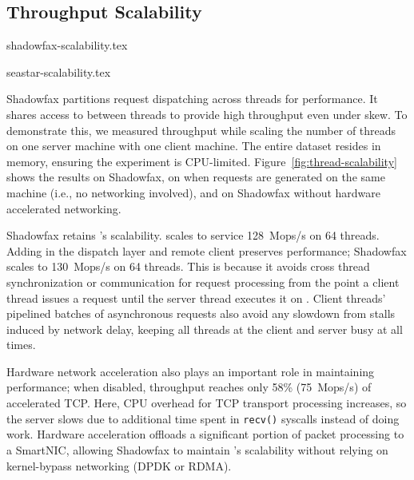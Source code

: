 \subsection{Throughput Scalability}
\label{sec:eval:clients}

 {shadowfax-scalability.tex}

 {seastar-scalability.tex}

Shadowfax partitions request dispatching across threads for
performance.
%
It shares access to \faster between threads to provide high
throughput even under skew.
%
To demonstrate this, we measured throughput while scaling the number of threads
on one server machine with one client machine.
%
The entire dataset resides in memory, ensuring the experiment is CPU-limited.
%
Figure~\ref{fig:thread-scalability} shows the results on Shadowfax, on
\faster when requests are generated on the same machine (i.e., no networking involved), and on Shadowfax without
hardware accelerated networking.

%
Shadowfax retains \faster{}'s scalability.
%
\faster{} scales to service 128~Mops/s on 64 threads.
%
Adding in the dispatch layer and remote client preserves performance;
Shadowfax scales to 130~Mops/s on 64 threads.
%
This is because it avoids cross thread synchronization or communication for
request processing from the point a client thread issues a request until the
server thread executes it on \faster.
%
Client threads' pipelined batches of asynchronous requests also avoid any
slowdown from stalls induced by network delay, keeping all threads at the
client and server busy at all times.

Hardware network acceleration also plays an important role in
maintaining performance; when disabled, throughput reaches only 58\%
(75~Mops/s) of
accelerated TCP.
%
Here, CPU overhead for TCP transport processing increases, so the server
slows due to additional time spent in \texttt{recv()} syscalls instead of doing
work.
%
Hardware acceleration offloads a significant portion of packet processing to a
SmartNIC, allowing Shadowfax to maintain \faster{}'s scalability without
relying on kernel-bypass networking (DPDK or RDMA).

